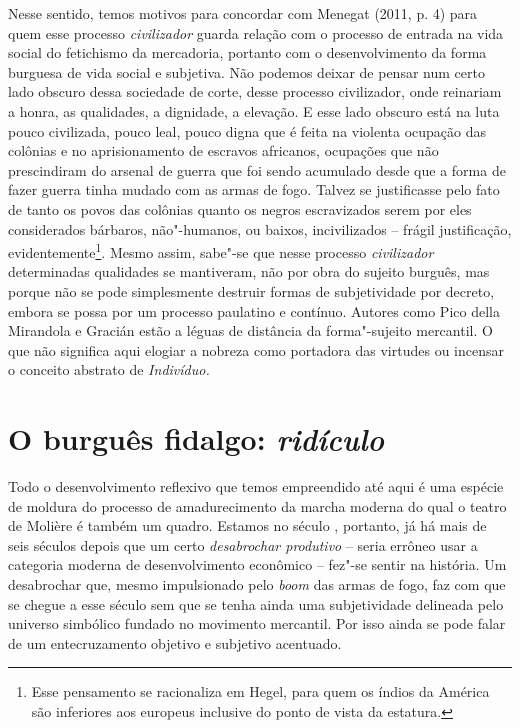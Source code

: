 Nesse sentido, temos motivos para concordar com Menegat (2011, p. 4)
para quem esse processo \emph{civilizador} guarda relação com o processo
de entrada na vida social do fetichismo da mercadoria, portanto com o
desenvolvimento da forma burguesa de vida social e subjetiva. Não
podemos deixar de pensar num certo lado obscuro dessa sociedade de
corte, desse processo civilizador, onde reinariam a honra, as
qualidades, a dignidade, a elevação. E esse lado obscuro está na luta
pouco civilizada, pouco leal, pouco digna que é feita na violenta
ocupação das colônias e no aprisionamento de escravos africanos,
ocupações que não prescindiram do arsenal de guerra que foi sendo
acumulado desde que a forma de fazer guerra tinha mudado com as armas de
fogo. Talvez se justificasse pelo fato de tanto os povos das colônias
quanto os negros escravizados serem por eles considerados bárbaros,
não"-humanos, ou baixos, incivilizados -- frágil justificação,
evidentemente\footnote{Esse pensamento se racionaliza em Hegel, para
quem os índios da América são inferiores aos europeus inclusive do
ponto de vista da estatura.}. Mesmo assim, sabe"-se que nesse processo
\emph{civilizador} determinadas qualidades se mantiveram, não por obra
do sujeito burguês, mas porque não se pode simplesmente destruir formas
de subjetividade por decreto, embora se possa por um processo paulatino
e contínuo. Autores como Pico della Mirandola e Gracián estão a léguas
de distância da forma"-sujeito mercantil. O que não significa aqui
elogiar a nobreza como portadora das virtudes ou incensar o conceito
abstrato de \emph{Indivíduo.}

\section{O burguês fidalgo: \emph{ridículo}}

Todo o desenvolvimento reflexivo que temos empreendido até aqui é uma
espécie de moldura do processo de amadurecimento da marcha moderna do
qual o teatro de Molière é também um quadro. Estamos no século ,
portanto, já há mais de seis séculos depois que um certo
\emph{desabrochar produtivo} -- seria errôneo usar a categoria moderna
de desenvolvimento econômico -- fez"-se sentir na história. Um
desabrochar que, mesmo impulsionado pelo \emph{boom} das armas de fogo,
faz com que se chegue a esse século sem que se tenha ainda uma
subjetividade delineada pelo universo simbólico fundado no movimento
mercantil. Por isso ainda se pode falar de um entecruzamento objetivo e
subjetivo acentuado.

